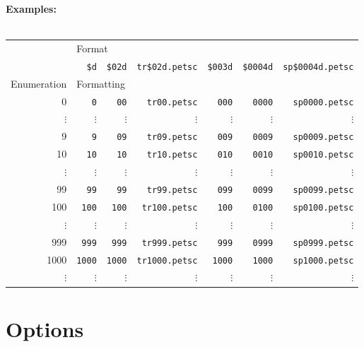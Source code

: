 \documentclass{article}
\begin{document}
\textbf{Examples:} \\
\\
\begin{tabular}{r|r|r|r|r|r|r}
			& \multicolumn{6}{l}{Format}																												\\ \cline{2-7}
			& \texttt{\$d}			& \texttt{\$02d}		& \texttt{tr\$02d.petsc}	& \texttt{\$003d}	& \texttt{\$0004d}	& \texttt{sp\$0004d.petsc}	\\ \hline
Enumeration	& \multicolumn{6}{l}{Formatting}																											\\ \hline
0			& \texttt{0}				& \texttt{00}		& \texttt{tr00.petsc}	& \texttt{000}		& \texttt{0000}		& \texttt{sp0000.petsc}		\\
$\vdots$		& $\vdots$				& $\vdots$			& $\vdots$				& $\vdots$			& $\vdots$			& $\vdots$					\\
9			& \texttt{9}				& \texttt{09}		& \texttt{tr09.petsc}	& \texttt{009}		& \texttt{0009}		& \texttt{sp0009.petsc}		\\
10			& \texttt{10}			& \texttt{10}		& \texttt{tr10.petsc}	& \texttt{010}		& \texttt{0010}		& \texttt{sp0010.petsc}		\\
$\vdots$		& $\vdots$				& $\vdots$			& $\vdots$				& $\vdots$			& $\vdots$			& $\vdots$					\\
99			& \texttt{99}			& \texttt{99}		& \texttt{tr99.petsc}	& \texttt{099}		& \texttt{0099}		& \texttt{sp0099.petsc}		\\
100			& \texttt{100}			& \texttt{100}		& \texttt{tr100.petsc}	& \texttt{100}		& \texttt{0100}		& \texttt{sp0100.petsc}		\\
$\vdots$		& $\vdots$				& $\vdots$			& $\vdots$				& $\vdots$			& $\vdots$			& $\vdots$					\\
999			& \texttt{999}			& \texttt{999}		& \texttt{tr999.petsc}	& \texttt{999}		& \texttt{0999}		& \texttt{sp0999.petsc}		\\
1000			& \texttt{1000}			& \texttt{1000}		& \texttt{tr1000.petsc}	& \texttt{1000}		& \texttt{1000}		& \texttt{sp1000.petsc}		\\
$\vdots$		& $\vdots$				& $\vdots$			& $\vdots$				& $\vdots$			& $\vdots$			& $\vdots$					
\end{tabular}

%
%
\newpage
\section{Options}
\end{document}
